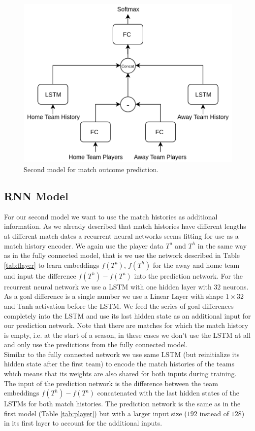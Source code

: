 \documentclass[a4paper]{article}
\begin{document}
\begin{figure} 
\includegraphics[scale=0.28]{img/Siamese2.png}
\caption{Second model for match outcome prediction.}
\label{fig:rnn}
\end{figure}

\subsection{RNN Model}
For our second model we want to use the match histories as additional
information. As we already described that match histories have different lengths
at different match dates a recurrent neural networks seems fitting for use as a
match history encoder. We again use the player data $T^a$ and $T^h$ in the same
way as in the fully connected model, that is we use the network described in
Table \ref{tab:flayer} to learn embeddings $f(T^a)$, $f(T^h)$ for the away and
home team and input the difference $f(T^h) - f(T^a)$ into the prediction
network. For the recurrent neural network we use a LSTM \cite{LSTM97} with one
hidden layer with $32$ neurons. As a goal difference is a single number we use a
Linear Layer with shape $1 \times 32$ and Tanh activation before the LSTM. We
feed the series of goal differences completely into the LSTM and use its last
hidden state as an additional input for our prediction network. Note that there
are matches for which the match history is empty, i.e. at the start of a season,
in these cases we don't use the LSTM at all and only use the predictions from
the fully connected model.\\
Similar to the fully connected network we use same LSTM (but reinitialize its
hidden state after the first team) to encode the match histories of the teams
which means that its weights are also shared for both inputs during training. \\
The input of the prediction network is the difference between the team
embeddings $f(T^h) - f(T^a)$ concatenated with the last hidden states of the
LSTMs for both match histories. The prediction network is the same as in the
first model (Table \ref{tab:player}) but with a larger input size ($192$ instead
of $128$) in its first layer to account for the additional inputs.
\end{document}
